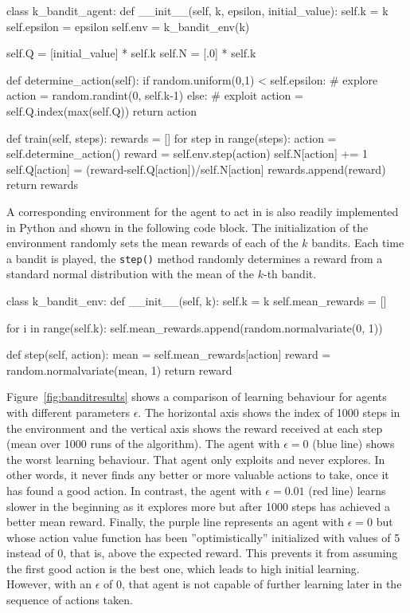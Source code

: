 \begin{pythoncode}
class k_bandit_agent:
    def __init__(self, k, epsilon, initial_value):
        self.k = k
        self.epsilon = epsilon
        self.env = k_bandit_env(k)

        self.Q = [initial_value] * self.k
        self.N = [.0] * self.k

    def determine_action(self):
        if random.uniform(0,1) < self.epsilon:
            # explore
            action = random.randint(0, self.k-1)
        else:
            # exploit
            action = self.Q.index(max(self.Q))
        return action

    def train(self, steps):
        rewards = []
        for step in range(steps):
            action = self.determine_action()
            reward = self.env.step(action)
            self.N[action] += 1
            self.Q[action] = (reward-self.Q[action])/self.N[action]
            rewards.append(reward)
        return rewards
\end{pythoncode}

A corresponding environment for the agent to act in is also readily implemented in Python and shown in the following code block. The initialization of the environment randomly sets the mean rewards of each of the $k$ bandits. Each time a bandit is played, the \texttt{step()} method randomly determines a reward from a standard normal distribution with the mean of the $k$-th bandit.

\begin{pythoncode}
class k_bandit_env:
    def __init__(self, k):
        self.k = k
        self.mean_rewards = []

        for i in range(self.k):
            self.mean_rewards.append(random.normalvariate(0, 1))

    def step(self, action):
        mean = self.mean_rewards[action]
        reward = random.normalvariate(mean, 1)
        return reward
\end{pythoncode}

Figure~\ref{fig:banditresults} shows a comparison of learning behaviour for agents with different parameters $\epsilon$. The horizontal axis shows the index of 1000 steps in the environment and the vertical axis shows the reward received at each step (mean over 1000 runs of the algorithm). The agent with $\epsilon=0$ (blue line) shows the worst learning behaviour. That agent only exploits and never explores. In other words, it never finds any better or more valuable actions to take, once it has found a good action. In contrast, the agent with $\epsilon=0.01$ (red line) learns slower in the beginning as it explores more but after 1000 steps has achieved a better mean reward. Finally, the purple line represents an agent with $\epsilon=0$ but whose action value function has been ''optimistically'' initialized with values of 5 instead of 0, that is, above the expected reward. This prevents it from assuming the first good action is the best one, which leads to high initial learning. However, with an $\epsilon$ of 0, that agent is not capable of further learning later in the sequence of actions taken. 

